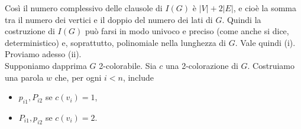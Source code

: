 \begin{enumerate}
          Così il numero complessivo delle clausole di $I(G)$ è $|V|+2|E|$, e
          cioè la somma tra il numero dei vertici e il doppio del numero dei
          lati di $G$. Quindi la costruzione di $I(G)$ può farsi in modo univoco
          e preciso (come anche si dice, deterministico) e, soprattutto,
          polinomiale nella lunghezza di $G$. Vale quindi (i). Proviamo adesso
          (ii).\\
          Supponiamo dapprima $G$ 2-colorabile. Sia $c$ una 2-colorazione
          di $G$. Costruiamo una parola $w$ che, per ogni $i<n$, include

          \begin{itemize}
              \item $p_{i 1}, P_{i 2}$ se $c\left(v_i\right)=1$,
              \item $P_{i 1}, p_{i 2}$ se $c\left(v_i\right)=2$.
          \end{itemize}


\end{enumerate}
